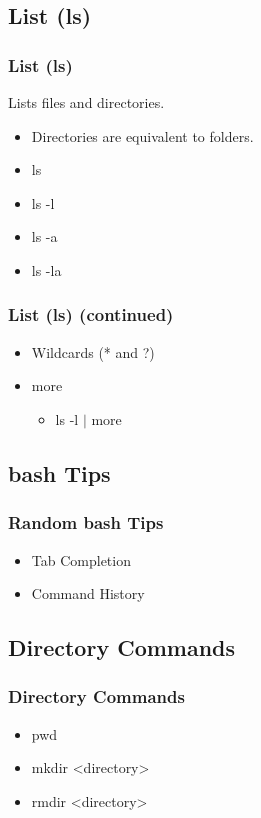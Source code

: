 \documentclass[hyperref={pdfpagelabels=false}]{beamer}
\begin{document}
\subsection{List (ls)}
\frame
{
    \frametitle{List (ls)}
    Lists files and directories.
    \begin{itemize}
    \item{Directories are equivalent to folders.}
    \end{itemize}
    \begin{itemize}
    \item{ls}
    \item{ls -l}
    \item{ls -a}
    \item{ls -la}
    \end{itemize}
}
\frame
{
    \frametitle{List (ls) (continued)}
    \begin{itemize}
    \item{Wildcards (* and ?)}
    \item{more}
        \begin{itemize}    
        \item{ls -l $\mid$ more}
        \end{itemize}
    \end{itemize}
}
\subsection{bash Tips}	
\frame
{
    \frametitle{Random bash Tips}
    \begin{itemize}
    \item{Tab Completion}
    \item{Command History}
    \end{itemize}
}
\subsection{Directory Commands}
\frame
{
    \frametitle{Directory Commands}
    \begin{itemize}
    \item{pwd}
    \item{mkdir {\textless}directory\textgreater\hspace{.5 pc}}
    \item{rmdir {\textless}directory\textgreater\hspace{.5 pc}}
    \end{itemize}
}
\end{document}
